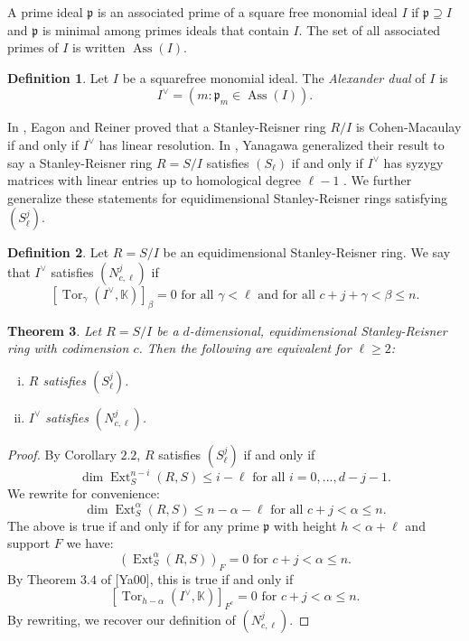 \documentclass[11pt]{amsart}
\numberwithin{equation}{section}
\newtheorem{theorem}{Theorem}[section]
\theoremstyle{definition}
\newtheorem{defn}[theorem]{Definition}
\theoremstyle{remark}
\newcommand{\Ass}{\operatorname{Ass}}
\newcommand{\Ext}{\operatorname{Ext}}
\newcommand{\Tor}{\operatorname{Tor}}
\begin{document}
A prime ideal $\mathfrak{p}$ is an associated prime of a square free monomial ideal $I$ if $\mathfrak{p} \supseteq I$ and $\mathfrak{p}$ is minimal among primes ideals that contain $I$. The set of all associated primes of $I$ is written $\Ass (I)$.

\begin{defn}
Let $I$ be a squarefree monomial ideal. The \textit{Alexander dual} of $I$ is \[ I^{\vee} = (m : \mathfrak{p}_m \in \Ass(I)). \]
\end{defn}

In \cite{ER98}, Eagon and Reiner proved that a Stanley-Reisner ring $R/I$ is Cohen-Macaulay if and only if $I^\vee$ has linear resolution.  In \cite{Ya00}, Yanagawa generalized their result to say a Stanley-Reisner ring $R=S/I$ satisfies $(S_{\ell})$ if and only if $I^\vee$ has syzygy matrices with linear entries up to homological degree $\ell-1$ \cite{Ya00}. We further generalize these statements for equidimensional Stanley-Reisner rings satisfying $(S_{\ell} ^j)$.

\begin{defn}
Let $R = S/I$ be an equidimensional Stanley-Reisner ring.  We say that $I^{\vee}$ satisfies $(N_{c,\ell}^j)$ if \[ [ \Tor_{\gamma}(I^\vee,\mathbb{K})]_{\beta} = 0 \textrm{ for all } \gamma < \ell \textrm{ and for all } c+j+\gamma < \beta \leq n. \]
\end{defn}
\begin{theorem}
Let $R=S/I$ be a $d$-dimensional, equidimensional Stanley-Reisner ring with codimension $c$. Then the following are equivalent for $\ell \geq 2$:
\begin{enumerate}[(i)]
\item $R$ satisfies $(S_{\ell}^j)$.
\item $I^\vee$ satisfies $(N_{c,\ell}^j)$.
\end{enumerate}
\end{theorem}

\begin{proof}
By Corollary $2.2$, $R$ satisfies $(S_{\ell}^j)$ if and only if
\[ \dim \Ext_S^{n-i}(R,S) \leq i-\ell \textrm{ for all } i = 0,..., d-j-1. \]
We rewrite for convenience:
\[ \dim \Ext_S^{\alpha}(R,S) \leq n-\alpha-\ell \textrm{ for all } c+j < \alpha \leq n.\]
The above is true if and only if for any prime $\mathfrak{p}$ with height $h < \alpha + \ell$ and support $F$ we have:
\[ (\Ext_S^{\alpha}(R,S))_F = 0 \textrm{ for } c+j < \alpha \leq n. \]
By Theorem $3.4$ of [Ya00], this is true if and only if
\[ [\Tor_{h-\alpha}(I^\vee,\mathbb{K})]_{F^c}=0 \textrm{ for } c+j < \alpha \leq n. \]
By rewriting, we recover our definition of $(N_{c,\ell}^j)$.

\end{proof}
\end{document}
